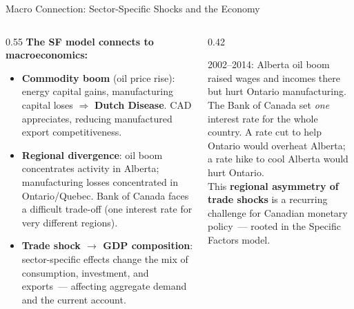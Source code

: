 \documentclass[aspectratio=169]{beamer}
\begin{document}
\begin{frame}{Macro Connection: Sector-Specific Shocks and the Economy}
\begin{columns}[T]
\begin{column}{0.55\textwidth}
\textbf{The SF model connects to macroeconomics:}
\begin{itemize}\small
  \item \textbf{Commodity boom} (oil price rise):
        energy capital gains, manufacturing capital loses
        $\Rightarrow$ \textbf{Dutch Disease}.
        CAD appreciates, reducing manufactured export
        competitiveness.
  \item \textbf{Regional divergence}: oil boom
        concentrates activity in Alberta; manufacturing
        losses concentrated in Ontario/Quebec.
        Bank of Canada faces a difficult trade-off
        (one interest rate for very different regions).
  \item \textbf{Trade shock $\to$ GDP composition}:
        sector-specific effects change the mix of
        consumption, investment, and exports~---
        affecting aggregate demand and the current
        account.
\end{itemize}
\end{column}
\begin{column}{0.42\textwidth}
\begin{canadex}
\footnotesize 2002--2014: Alberta oil boom raised
wages and incomes there but hurt Ontario manufacturing.\\[0.2em]
The Bank of Canada set \emph{one} interest rate for
the whole country.  A rate cut to help Ontario would
overheat Alberta; a rate hike to cool Alberta would
hurt Ontario.\\[0.2em]
This \textbf{regional asymmetry of trade shocks} is
a recurring challenge for Canadian monetary policy~---
rooted in the Specific Factors model.
\end{canadex}
\end{column}
\end{columns}
\end{frame}
\end{document}
